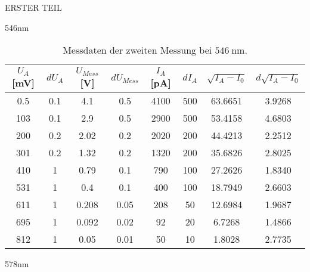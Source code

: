 \begin{appendix}
\begin{chapter}{ERSTER TEIL}
\begin{section}{546nm}
        \begin{table}[htbp]
          \centering
          \scriptsize
          \begin{tabular}{|c|c|c|c|c|c|c|c|}
            \hline
            $U_{A}$ [mV] & $dU_{A}$ & $U_{Mess}$ [V] & $dU_{Mess}$ & 
                $I_{A}$ [pA] & $dI_{A}$ & $\sqrt{I_{A}-I_0}$ & 
                $d\sqrt{I_{A}-I_0}$ \\ \hline
            0.5 & 0.1 & 4.1 & 0.5 & 4100 & 500 & 63.6651 & 3.9268 \\ \hline
            103 & 0.1 & 2.9 & 0.5 & 2900 & 500 & 53.4158 & 4.6803 \\ \hline
            200 & 0.2 & 2.02 & 0.2 & 2020 & 200 & 44.4213 & 2.2512 \\ \hline
            301 & 0.2 & 1.32 & 0.2 & 1320 & 200 & 35.6826 & 2.8025 \\ \hline
            410 & 1 & 0.79 & 0.1 & 790 & 100 & 27.2626 & 1.8340 \\ \hline
            531 & 1 & 0.4 & 0.1 & 400 & 100 & 18.7949 & 2.6603 \\ \hline
            611 & 1 & 0.208 & 0.05 & 208 & 50 & 12.6984 & 1.9687 \\ \hline
            695 & 1 & 0.092 & 0.02 & 92 & 20 & 6.7268 & 1.4866 \\ \hline
            812 & 1 & 0.05 & 0.01 & 50 & 10 & 1.8028 & 2.7735 \\ \hline
          \end{tabular}
          \caption{Messdaten der zweiten Messung bei $\SI{546}{\nano\meter}$.}
          \label{tab:546_2}
        \end{table}
        
      \end{section}
      
     
     
      \newpage
      \begin{section}{578nm}
        \label{Anhang:chp:ERSTERTEIL:sec:578}
        

\end{section}
\end{chapter}
\end{appendix}
